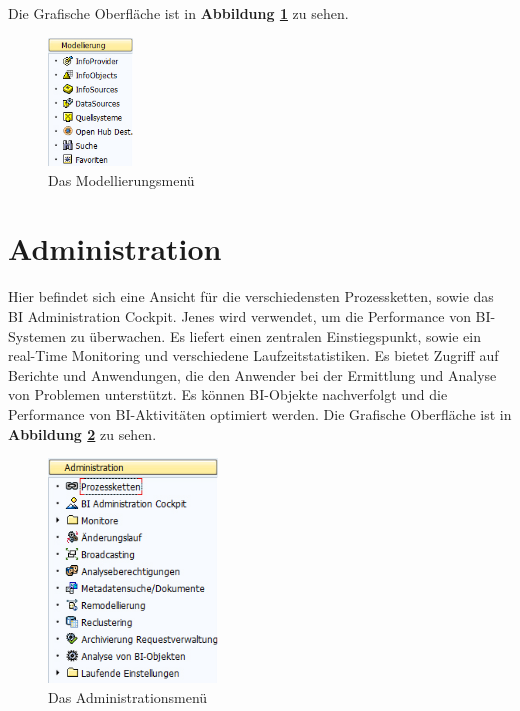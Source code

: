Die Grafische Oberfläche ist in  \textbf{Abbildung \ref{pic:Modellierung}}  zu sehen.
\begin{figure}[H]
    \centering
    \includegraphics[width=0.2\textwidth]{files/Modellierung}
    \caption{Das Modellierungsmenü}
    \label{pic:Modellierung}
\end{figure}

\pagebreak

\section{Administration} Hier befindet sich eine Ansicht für die verschiedensten Prozessketten, sowie das BI Administration Cockpit. Jenes wird verwendet, um die Performance von BI-Systemen zu überwachen. Es liefert einen zentralen Einstiegspunkt, sowie ein real-Time Monitoring und verschiedene Laufzeitstatistiken. Es bietet Zugriff auf Berichte und Anwendungen, die den Anwender bei der Ermittlung und Analyse von Problemen unterstützt. Es können BI-Objekte nachverfolgt und die Performance von BI-Aktivitäten optimiert werden.
Die Grafische Oberfläche ist in  \textbf{Abbildung \ref{pic:Administration}}  zu sehen.
\begin{figure}[H]
    \centering
    \includegraphics[width=0.4\textwidth]{files/Administration}
    \caption{Das Administrationsmenü}
    \label{pic:Administration}
\end{figure}


